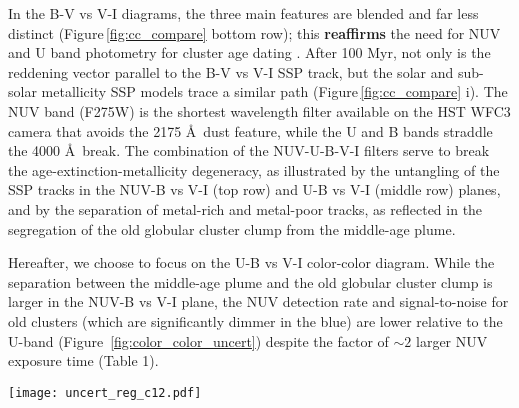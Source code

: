 \documentclass[linenumbers]{aastex63}
\begin{document}
In the B-V vs V-I diagrams, the three main features are blended and far less distinct (Figure\,\ref{fig:cc_compare} bottom row); this \textbf{reaffirms} the need for NUV and U band photometry for cluster age dating \citep{smith_young_2007}.  
After 100 Myr, not only is the reddening vector parallel to the B-V vs V-I SSP track, but the solar and sub-solar metallicity SSP models trace a similar path (Figure\,\ref{fig:cc_compare} i).  The NUV band (F275W) is the shortest wavelength filter available on the HST WFC3 camera that avoids the 2175 \AA\ dust feature, while the U and B bands straddle the 4000 \AA\ break.  The combination of the NUV-U-B-V-I filters serve to break the age-extinction-metallicity degeneracy, as illustrated by the untangling of the SSP tracks in the NUV-B vs V-I (top row) and U-B vs V-I (middle row) planes, and by the separation of metal-rich and metal-poor tracks, as reflected in the segregation of the old globular cluster clump from the middle-age plume. 

Hereafter, we choose to focus on the U-B vs V-I color-color diagram.  While the separation between the middle-age plume and the old globular cluster clump is larger in the NUV-B vs V-I plane, the NUV detection rate and signal-to-noise for old clusters (which are significantly dimmer in the blue) are lower relative to the U-band (Figure~\ref{fig:color_color_uncert}) despite the factor of $\sim2$ larger NUV exposure time (Table 1).

\begin{figure*} 
\texttt{[image: uncert\_reg\_c12.pdf]}
 \caption{Mean color uncertainties for the NUV-B vs V-I (top row) and U-B vs V-I (bottom row) diagrams. We present class 1+2 clusters for ML (left two panels) and human classifications (right two panels) separately. %
 The maps show the mean uncertainty in each bin, and only bins with at least 5 clusters are displayed. }
 \label{fig:color_color_uncert}
\end{figure*}

\end{document}
